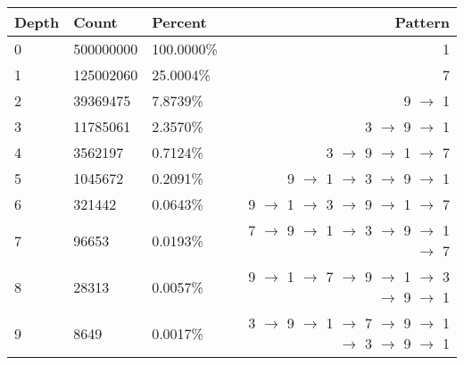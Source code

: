 \documentclass[13pt]{article}
\begin{document}
\begin{tabular} { l l l r }
Depth & Count      & Percent   & Pattern\\
\hline
    0 &  500000000 & 100.0000\% & 1\\
    1 &  125002060 &  25.0004\% & 7\\
    2 &   39369475 &   7.8739\% & 9 $\rightarrow$ 1\\
    3 &   11785061 &   2.3570\% & 3 $\rightarrow$ 9 $\rightarrow$ 1\\
    4 &    3562197 &   0.7124\% & 3 $\rightarrow$ 9 $\rightarrow$ 1 $\rightarrow$ 7\\
    5 &    1045672 &   0.2091\% & 9 $\rightarrow$ 1 $\rightarrow$ 3 $\rightarrow$ 9 $\rightarrow$ 1\\
    6 &     321442 &   0.0643\% & 9 $\rightarrow$ 1 $\rightarrow$ 3 $\rightarrow$ 9 $\rightarrow$ 1 $\rightarrow$ 7\\
    7 &      96653 &   0.0193\% & 7 $\rightarrow$ 9 $\rightarrow$ 1 $\rightarrow$ 3 $\rightarrow$ 9 $\rightarrow$ 1 $\rightarrow$ 7\\
    8 &      28313 &   0.0057\% & 9 $\rightarrow$ 1 $\rightarrow$ 7 $\rightarrow$ 9 $\rightarrow$ 1 $\rightarrow$ 3 $\rightarrow$ 9 $\rightarrow$ 1\\
    9 &       8649 &   0.0017\% & 3 $\rightarrow$ 9 $\rightarrow$ 1 $\rightarrow$ 7 $\rightarrow$ 9 $\rightarrow$ 1 $\rightarrow$ 3 $\rightarrow$ 9 $\rightarrow$ 1\\
\end{tabular}\\\\
\end{document}
